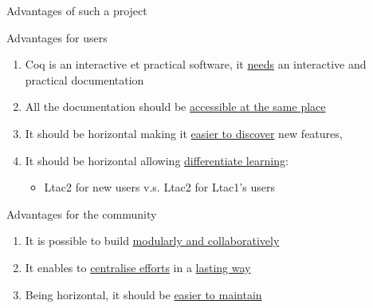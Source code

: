 \documentclass[10pt]{beamer}
\begin{document}
\begin{frame}{Advantages of such a project}
  \begin{tcbSol}{Advantages for users}
    \begin{enumerate}
      \item<1-> Coq is an interactive et practical software, it \ul{needs} an
            interactive and practical documentation
      \item<2-> All the documentation should be \ul{accessible at the same place}
      \item<3-> It should be horizontal making it \ul{easier to discover} new features,
      \item<4-> It should be horizontal allowing \ul{differentiate learning}:
      \begin{itemize}[label=$\hookrightarrow$]
        \item Ltac2 for new users\;  v.s.  \;Ltac2 for Ltac1's users
      \end{itemize}
    \end{enumerate}
  \end{tcbSol}
  \begin{tcbSol}{Advantages for the community}
    \begin{enumerate}
      \item<5-> It is possible to build \ul{modularly and collaboratively}
      \item<6-> It enables to \ul{centralise efforts} in a \ul{lasting way}
      \item<7-> Being horizontal, it should be \ul{easier to maintain}
    \end{enumerate}
  \end{tcbSol}
\end{frame}
\end{document}
